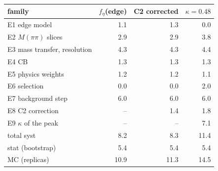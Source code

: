 \begin{tabular}{lrrr}
\hline
 family & $f_\eta$(edge) & C2 corrected & $\kappa=0.48$ \\
\hline
 E1 edge model & 1.1 & 1.3 & 0.0 \\
 E2 $M(\pi\pi)$ slices & 2.9 & 2.9 & 3.8 \\
 E3 mass transfer, resolution & 4.3 & 4.3 & 4.4 \\
 E4 CB & 1.3 & 1.3 & 1.3 \\
 E5 physics weights & 1.2 & 1.2 & 1.1 \\
 E6 selection & 0.0 & 0.0 & 2.0 \\
 E7 background step & 6.0 & 6.0 & 6.0 \\
 E8 C2 correction & -- & 1.4 & 1.8 \\
 E9 $\kappa$ of the peak & -- & -- & 7.1 \\
\hline
 total syst & 8.2 & 8.3 & 11.4 \\
 stat (bootstrap) & 5.4 & 5.4 & 5.4 \\
 MC (replicas) & 10.9 & 11.3 & 14.5 \\
\hline
\end{tabular}
